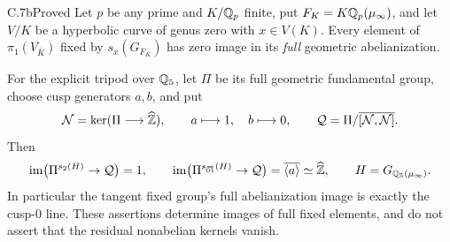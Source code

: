 \begin{claim}{C.7b}{Proved}
Let $p$ be any prime and $K/\mathbb Q_p$ finite, put $F_K=K\mathbb Q_p(\mu_\infty)$,
and let $V/K$
be a hyperbolic curve of genus zero with $x\in V(K)$. Every element of
$\pi_1(V_{\bar K})$ fixed by $s_x(G_{F_K})$ has zero image in its
\emph{full} geometric abelianization.

For the explicit tripod over $\mathbb Q_5$, let $\Pi$ be its full geometric
fundamental group, choose cusp generators $a,b$, and put
\[
 \mathcal N=\ker(\Pi\longrightarrow\widehat{\mathbb Z}),\qquad
 a\longmapsto1,\quad b\longmapsto0,
 \qquad
 \mathcal Q=\Pi/\overline{[\mathcal N,\mathcal N]}.
\]
Then
\[
 \operatorname{im}\bigl(\Pi^{s_2(H)}\to\mathcal Q\bigr)=1,
 \qquad
 \operatorname{im}\bigl(\Pi^{s_{\overrightarrow{01}}(H)}
                  \to\mathcal Q\bigr)=\overline{\langle a\rangle}
                  \simeq\widehat{\mathbb Z},
 \qquad H=G_{\mathbb Q_5(\mu_\infty)}.
\]
In particular the tangent fixed group's full abelianization image is
exactly the cusp-$0$ line. These assertions determine images of full fixed
elements, and do not assert that the residual nonabelian kernels vanish.
\end{claim}
